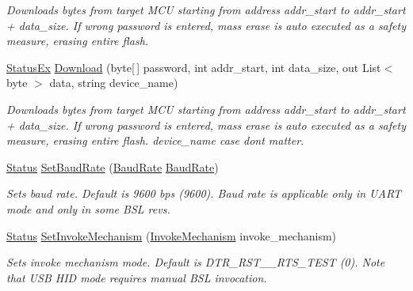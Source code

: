 \begin{DoxyCompactItemize}
\begin{DoxyCompactList}\small\item\em Downloads bytes from target M\+CU starting from address \textquotesingle{}addr\+\_\+start\textquotesingle{} to \textquotesingle{}addr\+\_\+start\textquotesingle{} + \textquotesingle{}data\+\_\+size\textquotesingle{}. If wrong password is entered, mass erase is auto executed as a safety measure, erasing entire flash. \end{DoxyCompactList}\item 
\mbox{\hyperlink{class_b_s_l430___n_e_t_1_1_status_ex}{Status\+Ex}} \mbox{\hyperlink{interface_b_s_l430___n_e_t_1_1_i_bsl430_net_a416c9d925e98bc5ed00a89e76c4a8501}{Download}} (byte\mbox{[}$\,$\mbox{]} password, int addr\+\_\+start, int data\+\_\+size, out List$<$ byte $>$ data, string device\+\_\+name)
\begin{DoxyCompactList}\small\item\em Downloads bytes from target M\+CU starting from address \textquotesingle{}addr\+\_\+start\textquotesingle{} to \textquotesingle{}addr\+\_\+start\textquotesingle{} + \textquotesingle{}data\+\_\+size\textquotesingle{}. If wrong password is entered, mass erase is auto executed as a safety measure, erasing entire flash. device\+\_\+name case dont matter. \end{DoxyCompactList}\item 
\mbox{\hyperlink{class_b_s_l430___n_e_t_1_1_status}{Status}} \mbox{\hyperlink{interface_b_s_l430___n_e_t_1_1_i_bsl430_net_a4ce151c0bd961d76dc9dfa2b07788b99}{Set\+Baud\+Rate}} (\mbox{\hyperlink{namespace_b_s_l430___n_e_t_a8d30c263598635a481840944d38aeb70}{Baud\+Rate}} \mbox{\hyperlink{namespace_b_s_l430___n_e_t_a8d30c263598635a481840944d38aeb70}{Baud\+Rate}})
\begin{DoxyCompactList}\small\item\em Sets baud rate. Default is 9600 bps (9600). Baud rate is applicable only in U\+A\+RT mode and only in some B\+SL revs. \end{DoxyCompactList}\item 
\mbox{\hyperlink{class_b_s_l430___n_e_t_1_1_status}{Status}} \mbox{\hyperlink{interface_b_s_l430___n_e_t_1_1_i_bsl430_net_a5edac897ededd878d53097ac4e9c6782}{Set\+Invoke\+Mechanism}} (\mbox{\hyperlink{namespace_b_s_l430___n_e_t_a6571fdf0fbbc8408b8428f4d642c1305}{Invoke\+Mechanism}} invoke\+\_\+mechanism)
\begin{DoxyCompactList}\small\item\em Sets invoke mechanism mode. Default is D\+T\+R\+\_\+\+R\+S\+T\+\_\+\+\_\+\+R\+T\+S\+\_\+\+T\+E\+ST (0). Note that U\+SB H\+ID mode requires manual B\+SL invocation. \end{DoxyCompactList}\item 

\end{DoxyCompactItemize}
